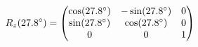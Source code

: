 \documentclass[preview]{standalone}
\begin{document}
\begin{align*}
\special{dvisvgm:raw <g id='unique000'>}R_z(27.8^\circ) = \begin{pmatrix} \cos(27.8^\circ) & -\sin(27.8^\circ) & 0 \\ \sin(27.8^\circ) & \cos(27.8^\circ) & 0 \\ 0 & 0 & 1 \end{pmatrix}\special{dvisvgm:raw </g>}
\end{align*}
\end{document}
